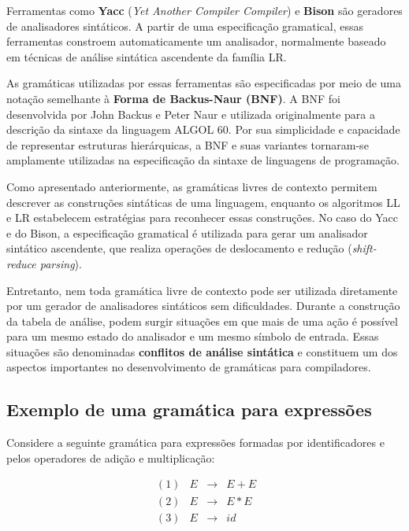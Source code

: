 \documentclass[
  brazilian,
  letterpaper,
]{book}
\theoremstyle{plain}
\theoremstyle{definition}
\theoremstyle{remark}
\begin{document}
Ferramentas como \textbf{Yacc} (\emph{Yet Another Compiler Compiler}) e
\textbf{Bison} são geradores de analisadores sintáticos. A partir de uma
especificação gramatical, essas ferramentas constroem automaticamente um
analisador, normalmente baseado em técnicas de análise sintática
ascendente da família LR.

As gramáticas utilizadas por essas ferramentas são especificadas por
meio de uma notação semelhante à \textbf{Forma de Backus-Naur (BNF)}. A
BNF foi desenvolvida por John Backus e Peter Naur e utilizada
originalmente para a descrição da sintaxe da linguagem ALGOL 60. Por sua
simplicidade e capacidade de representar estruturas hierárquicas, a BNF
e suas variantes tornaram-se amplamente utilizadas na especificação da
sintaxe de linguagens de programação.

Como apresentado anteriormente, as gramáticas livres de contexto
permitem descrever as construções sintáticas de uma linguagem, enquanto
os algoritmos LL e LR estabelecem estratégias para reconhecer essas
construções. No caso do Yacc e do Bison, a especificação gramatical é
utilizada para gerar um analisador sintático ascendente, que realiza
operações de deslocamento e redução (\emph{shift-reduce parsing}).

Entretanto, nem toda gramática livre de contexto pode ser utilizada
diretamente por um gerador de analisadores sintáticos sem dificuldades.
Durante a construção da tabela de análise, podem surgir situações em que
mais de uma ação é possível para um mesmo estado do analisador e um
mesmo símbolo de entrada. Essas situações são denominadas
\textbf{conflitos de análise sintática} e constituem um dos aspectos
importantes no desenvolvimento de gramáticas para compiladores.

\subsection{Exemplo de uma gramática para
expressões}\label{exemplo-de-uma-gramuxe1tica-para-expressuxf5es}

Considere a seguinte gramática para expressões formadas por
identificadores e pelos operadores de adição e multiplicação:

\[
\begin{array}{rccl}\
(1) & E & \rightarrow & E + E \\\
(2) & E & \rightarrow & E * E \\\
(3) & E & \rightarrow & id\
\end{array}
\]
\end{document}
